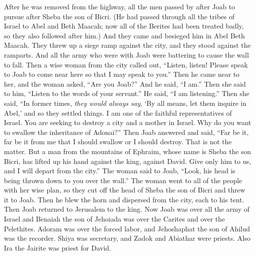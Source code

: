 \begin{biblechapter}
\verse After he was removed from the highway, all the men passed by after Joab to pursue after Sheba the son of Bicri.
 (He had passed through all the tribes of Israel to Abel and Beth Maacah; now all of the Berites had been treated badly, so they also followed after him.)
\verse And they came and besieged him in Abel Beth Maacah. They threw up a siege ramp against the city, and they stood against the ramparts. And all the army who were with Joab were battering to cause the wall to fall.
\verse Then a wise woman from the city called out, “Listen, listen! Please speak to Joab to come near here so that I may speak to you.”
\verse Then he came near to her, and the woman asked, “Are you Joab?” And he said, “I am.” Then she said to him, “Listen to the words of your servant.” He said, “I am listening.”
\verse Then she said, “In former times, \textit{they would always say}, ‘By all means, let them inquire in Abel,’ and so they settled things.
\verse I am one of the faithful representatives of Israel. You are seeking to destroy a city and a mother in Israel. Why do you want to swallow the inheritance of Adonai?”
\verse Then Joab answered and said, “Far be it, far be it from me that I should swallow or I should destroy.
\verse That is not the matter. But a man from the mountains of Ephraim, whose name is Sheba the son Bicri, has lifted up his hand against the king, against David. Give only him to us, and I will depart from the city.” The woman said to Joab, “Look, his head is being thrown down to you over the wall.”
\verse The woman went to all of the people with her wise plan, so they cut off the head of Sheba the son of Bicri and threw it to Joab. Then he blew the horn and dispersed from the city, each to his tent. Then Joab returned to Jerusalem to the king.
\verse Now Joab was over all the army of Israel and Benaiah the son of Jehoiada was over the Carites and over the Pelethites.
\verse Adoram was over the forced labor, and Jehoshaphat the son of Ahilud was the recorder.
\verse Shiya was secretary, and Zadok and Abiathar were priests.
\verse Also Ira the Jairite was priest for David.
\end{biblechapter}

